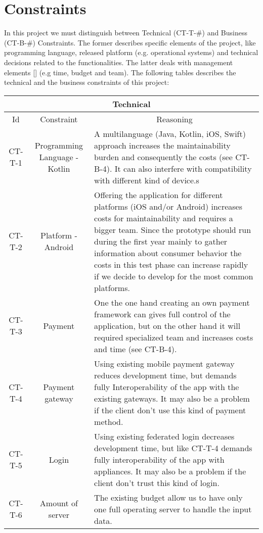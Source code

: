 \section{Constraints}

In this project we must distinguish between Technical (CT-T-\#) and Business (CT-B-\#) Constraints. The former describes specific elements
of the project, like programming language, released platform (e.g. operational systems) and technical decisions related to 
the functionalities. The latter deals with management elements [\cite{refonline:EFAD}] (e.g time, budget and team). The following
tables describes the technical and the business constraints of this project: 

\begin{table}[H]
    \begin{tabularx}{\textwidth}{|c|c|X|}
        \hline
        \multicolumn{3}{c}{\textbf{Technical}} \\
        \hline
        \toprule
        \multicolumn{1}{c}{Id} & \multicolumn{1}{c}{Constraint} & \multicolumn{1}{c}{Reasoning} \\
        \midrule
        CT-T-1 & Programming Language - Kotlin & A multilanguage (Java, Kotlin, iOS, Swift) approach increases
        the maintainability burden and consequently the costs (see CT-B-4). It can also interfere with
        compatibility with different kind of device.s  \\ 
        CT-T-2 & Platform - Android & Offering the application for different platforms (iOS and/or Android) increases
        costs for maintainability and requires a bigger team. Since the prototype should run during the
        first year mainly to gather information about consumer behavior the costs in this test phase can
        increase rapidly if we decide to develop for the most common platforms. \\ 
        CT-T-3 & Payment & One the one hand creating an own payment framework can gives full control of the application,
        but on the other hand it will required specialized team and increases costs and time (see CT-B-4). \\
        CT-T-4 & Payment gateway & Using existing \gls{mobile payment gateway} reduces development time, but demands
        fully Interoperability of the app with the existing gateways. It may also be a problem if the \gls{client}
        don't use this kind of payment method. \\
        CT-T-5 & Login & Using existing \gls{federated login} decreases development time, but like CT-T-4 demands
        fully interoperability of the app with appliances. It may also be a problem if the \gls{client}
        don't trust this kind of login. \\
        CT-T-6 & Amount of server & The existing budget allow us to have only one full operating server to handle
        the input data. \\
        \bottomrule
    \end{tabularx}
\end{table}

